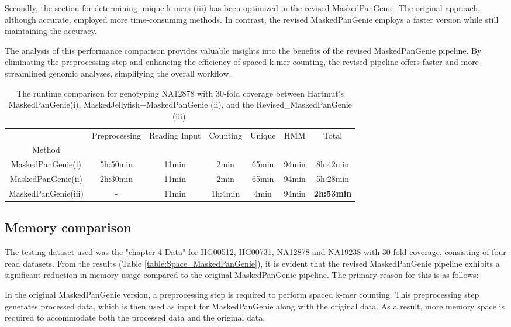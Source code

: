 \documentclass{PHlab-thesis}
\begin{document}
Secondly, the section for determining unique k-mers (iii) has been optimized in the revised MaskedPanGenie. The original approach, although accurate, employed more time-consuming methods. In contrast, the revised MaskedPanGenie employs a faster version while still maintaining the accuracy.

The analysis of this performance comparison provides valuable insights into the benefits of the revised MaskedPanGenie pipeline. By eliminating the preprocessing step and enhancing the efficiency of spaced k-mer counting, the revised pipeline offers faster and more streamlined genomic analyses, simplifying the overall workflow.
\begin{table}[ht!]
	\centering
	\begin{tabular*}{\textwidth}{@{\extracolsep{\fill}}ccccccc@{\extracolsep{\fill}}}
        \toprule
         & Preprocessing & Reading Input & Counting & Unique & HMM & Total\\
         Method & & & & & &\\
        \midrule
        MaskedPanGenie(i)& 5h:50min & 11min & 2min & 65min & 94min& 8h:42min \\
        MaskedPanGenie(ii)& 2h:30min & 11min & 2min & 65min & 94min & 5h:28min\\
        MaskedPanGenie(iii)& - & 11min & 1h:4min & 4min & 94min & \textbf{2h:53min}\\
        \bottomrule 
	\end{tabular*}
    \caption{The runtime comparison for genotyping NA12878 with 30-fold coverage between Hartmut's MaskedPanGenie(i), MaskedJellyfish+MaskedPanGenie (ii), and the Revised\_MaskedPanGenie (iii).}
	\label{table:MaskedPanGenie}
\end{table}
\subsection{Memory comparison}
The testing dataset used was the "chapter 4 Data" for HG00512, HG00731, NA12878 and NA19238 with 30-fold coverage, consisting of four read datasets. From the results (Table \ref{table:Space_MaskedPanGenie}), it is evident that the revised MaskedPanGenie pipeline exhibits a significant reduction in memory usage compared to the original MaskedPanGenie pipeline. The primary reason for this is as follows:

In the original MaskedPanGenie version, a preprocessing step is required to perform spaced k-mer counting. This preprocessing step generates processed data, which is then used as input for MaskedPanGenie along with the original data. As a result, more memory space is required to accommodate both the processed data and the original data.
\end{document}
